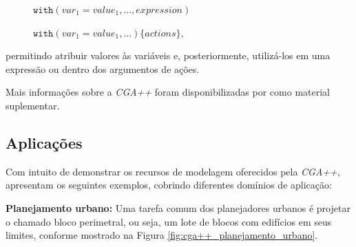 \vspace{0.3cm}

\begin{description}
    \item[] \qquad \qquad $\texttt{with}(var_1 = value_1, ..., expression)$
    \item[] \qquad \qquad $\texttt{with}(var_1 = value_1, ...) \{actions\}$,
\end{description}

\vspace{0.3cm}

\noindent permitindo atribuir valores às variáveis e, posteriormente, utilizá-los em uma expressão ou dentro dos argumentos de ações.

Mais informações sobre a \textit{CGA++} foram disponibilizadas por  como material suplementar.

\subsection{Aplicações}
\label{sec:aplicacoes_cga++}

Com intuito de demonstrar os recursos de modelagem oferecidos pela \textit{CGA++},  apresentam os seguintes exemplos, cobrindo diferentes domínios de aplicação:

\newpage

\textbf{Planejamento urbano:} Uma tarefa comum dos planejadores urbanos é projetar o chamado bloco perimetral, ou seja, um lote de blocos com edifícios em seus limites, conforme mostrado na Figura \ref{fig:cga++_planejamento_urbano}.

